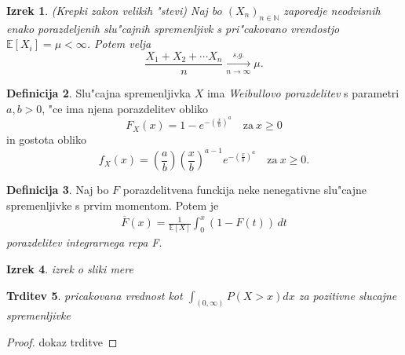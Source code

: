 \documentclass[12pt, a4paper, reqno]{amsart}
\theoremstyle{definition}
\newtheorem{definicija}{Definicija}[section]
\theoremstyle{plain}
\newtheorem{izrek}[definicija]{Izrek}
\newtheorem{trditev}[definicija]{Trditev}
\newcommand{\N}{\mathbb{N}}
\newcommand{\E}{\mathbb{E}}
\newcommand{\1}{\mathds{1}}
\begin{document}
    \begin{izrek}(Krepki zakon velikih "stevi)
        Naj bo $(X_n)_{n\in\N}$ zaporedje neodvisnih enako porazdeljenih
        slu"cajnih spremenljivk s pri"cakovano vrendostjo $\E\left[X_i\right] = \mu <\infty$. Potem velja
        \begin{equation*}
            \frac{X_1 + X_2 + \cdots X_n}{n}\xrightarrow[n\to\infty]{s.g.} \mu.
        \end{equation*}
        \label{izr:KrepkiZakonVelikihStevil}
    \end{izrek}

    \begin{definicija}
        Slu"cajna spremenljivka $X$ ima \textit{Weibullovo porazdelitev} s parametri $a, b > 0$, 
        "ce ima njena porazdelitev obliko 
        \begin{equation*}
            F_X(x) = 1 - e^{-\left(\tfrac{x}{b}\right)^a} \quad \text{za} \ x\geq 0
        \end{equation*}
        in gostota obliko
        \begin{equation*}
            f_X(x) = \left(\frac{a}{b}\right)\left(\frac{x}{b}\right)^{a-1}e^{-\left(\tfrac{x}{b}\right)^a} \quad \text{za} \ x\geq 0.
        \end{equation*}
        \label{def:WeibullovaPorazdelitev}
    \end{definicija}

    \begin{definicija}
        Naj bo $F$ porazdelitvena funckija neke nenegativne slu"cajne spremenljivke s prvim 
        momentom. Potem je 
        \begin{align*}
            \overline{F}(x) = \frac{1}{\mathbb{E}[X]} \int_0^x (1 - F(t)) \, dt
        \end{align*}
        \textit{porazdelitev integrarnega repa F}.
        \label{def:porazdelitevintegriranegaRepa}
    \end{definicija}

    \begin{izrek}
        izrek o sliki mere
    \end{izrek}

    \begin{trditev}
        pricakovana vrednost kot $\int_{(0, \infty)}P(X > x)dx$ za pozitivne slucajne spremenljivke
    \end{trditev}

    \begin{proof}
        dokaz trditve
    \end{proof}
\end{document}
